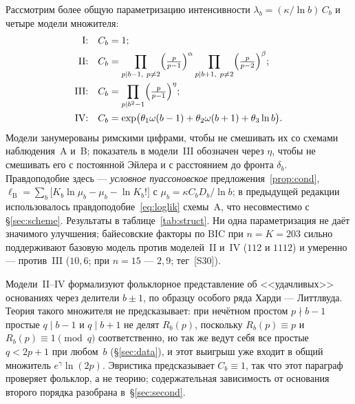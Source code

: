 \documentclass[11pt,a4paper]{article}
\theoremstyle{plain}
\theoremstyle{remark}
\newcommand{\Rb}{R_b}
\newcommand{\eg}{e^{\gamma}}
\begin{document}
Рассмотрим более общую параметризацию интенсивности $\lambda_b=(\kappa/\ln b)\,C_b$
и четыре модели множителя:
\begin{align*}
\text{I:}&\quad C_b=1;\\
\text{II:}&\quad C_b=\prod_{p\mid b-1,\ p\ne2}\Bigl(\tfrac{p}{p-1}\Bigr)^{\alpha}
                 \prod_{p\mid b+1,\ p\ne2}\Bigl(\tfrac{p}{p-2}\Bigr)^{\beta};\\
\text{III:}&\quad C_b=\prod_{p\mid b^2-1}\Bigl(\tfrac{p}{p-1}\Bigr)^{\eta};\\
\text{IV:}&\quad C_b=\exp\bigl(\theta_1\omega(b-1)+\theta_2\omega(b+1)+\theta_3\ln b\bigr).
\end{align*}
Модели занумерованы римскими цифрами, чтобы не смешивать их со схемами наблюдения~A
и~B; показатель в модели~III обозначен через $\eta$, чтобы не смешивать его с
постоянной Эйлера и с расстоянием до фронта $\delta_b$. Правдоподобие здесь --- \emph{условное пуассоновское}
предложения~\ref{prop:cond},
$\ell_{\mathrm B}=\sum_b\bigl[K_b\ln\mu_b-\mu_b-\ln K_b!\bigr]$ с
$\mu_b=\kappa C_b D_b/\ln b$; в предыдущей редакции использовалось
правдоподобие~\eqref{eq:loglik} схемы~A, что несовместимо с
\S\ref{sec:scheme}. Результаты в таблице~\ref{tab:struct}. Ни одна параметризация не
даёт значимого улучшения; байесовские факторы по BIC при $n=K=203$ сильно
поддерживают базовую модель против моделей~II и~IV ($112$ и $1112$) и умеренно ---
против~III ($10{,}6$; при $n=15$ --- $2{,}9$; тег~[S30]).

Модели~II--IV формализуют фольклорное представление об <<удачливых>> основаниях
через делители $b\pm1$, по образцу особого ряда Харди --- Литтлвуда. Теория такого
множителя не предсказывает: при нечётном простом $p\nmid b-1$ простые $q\mid b-1$
и $q\mid b+1$ не делят $\Rb(p)$, поскольку $\Rb(p)\equiv p$ и $\Rb(p)\equiv1\pmod q$ соответственно, но так
же ведут себя все простые $q<2p+1$ при любом~$b$ (\S\ref{sec:data}), и этот
выигрыш уже входит в общий множитель $\eg\ln(2p)$. Эвристика предсказывает
$C_b\equiv1$, так что этот параграф проверяет фольклор, а не теорию; содержательная
зависимость от основания второго порядка разобрана в~\S\ref{sec:second}.
\end{document}
